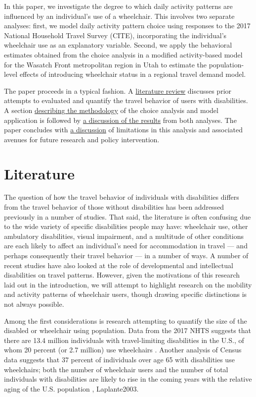 \documentclass[3p, authoryear, review]{elsarticle} %
\begin{document}
In this paper, we investigate the degree to which daily activity patterns are
influenced by an individual's use of a wheelchair. This involves two separate
analyses: first, we model daily activity pattern choice using responses to the
2017 National Household Travel Survey (CITE), incorporating the individual's wheelchair use as an explanatory variable.
Second, we apply the behavioral estimates obtained from the choice analysis
in a modified activity-based model for the Wasatch Front metropolitan region in
Utah to estimate the population-level effects of introducing wheelchair status in
a regional travel demand model.

The paper proceeds in a typical fashion. A \protect\hyperlink{literature}{literature review}
discusses prior attempts to evaluated and quantify the travel behavior of
users with disabilities. A section \protect\hyperlink{methodology}{describing the methodology}
of the choice analysis and model application is followed by \protect\hyperlink{results}{a discussion of the results}
from both analyses. The paper concludes with \protect\hyperlink{discussion}{a discussion}
of limitations in this analysis and associated avenues for future research and
policy intervention.

\hypertarget{sec-literature}{%
\section{Literature}\label{sec-literature}}

The question of how the travel behavior of individuals with disabilities differs
from the travel behavior of those without disabilities has been addressed
previously in a number of studies. That said, the literature is often confusing
due to the wide variety of specific disabilities people may have: wheelchair use,
other ambulatory disabilities, visual impairment, and a multitude of other
conditions are each likely to affect an individual's need for accommodation in
travel --- and perhaps consequently their travel behavior --- in a number of ways.
A number of recent studies have also looked at the role of developmental \citet{Wasfi2007}
and intellectual \citet{Feeley2019} disabilities on travel patterns. However,
given the motivations of this research laid out in the introduction, we will attempt to highlight
research on the mobility and activity patterns of wheelchair users, though
drawing specific distinctions is not always possible.

Among the first considerations is research attempting to quantify the size
of the disabled or wheelchair using population. Data from the 2017 NHTS
suggests that there are 13.4 million individuals with travel-limiting disabilities
in the U.S., of whom 20 percent (or 2.7 million) use wheelchairs \citet{Brumbaugh2018}.
Another analysis of Census data suggests that 37 percent of individuals over
age 65 with disabilities use wheelchairs; both the number of wheelchair users
and the number of total individuals with disabilities are likely to rise
in the coming years with the relative aging of the U.S. population \citet{Sweeney2004}, Laplante2003.
\end{document}
